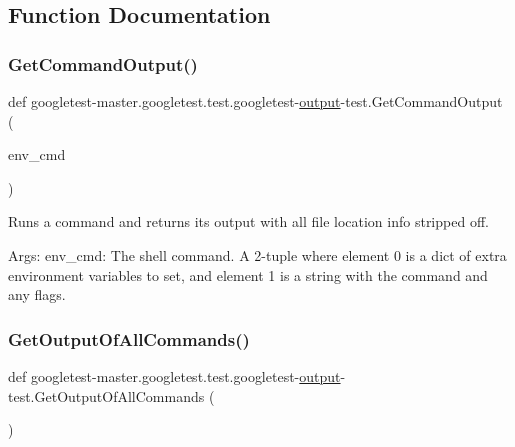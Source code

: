 \subsection{Function Documentation}
\mbox{\label{namespacegoogletest-master_1_1googletest_1_1test_1_1googletest-output-test_a36fa313f94b26c52704231f2a0d4e20a}} 
\subsubsection{\texorpdfstring{GetCommandOutput()}{GetCommandOutput()}}
{\footnotesize\ttfamily def googletest-\/master.\+googletest.\+test.\+googletest-\/\mbox{\hyperlink{namespacegoogletest-master_1_1googletest_1_1test_1_1googletest-output-test_a734f0a5bd94ba038f4350763c6977129}{output}}-\/test.\+Get\+Command\+Output (\begin{DoxyParamCaption}\item[{}]{env\+\_\+cmd }\end{DoxyParamCaption})}

\begin{DoxyVerb}Runs a command and returns its output with all file location
info stripped off.

Args:
  env_cmd:  The shell command. A 2-tuple where element 0 is a dict of extra
            environment variables to set, and element 1 is a string with
            the command and any flags.
\end{DoxyVerb}
 \mbox{\label{namespacegoogletest-master_1_1googletest_1_1test_1_1googletest-output-test_ae53cb6eb6487f7f2f8ed334f9afb0f4e}} 
\subsubsection{\texorpdfstring{GetOutputOfAllCommands()}{GetOutputOfAllCommands()}}
{\footnotesize\ttfamily def googletest-\/master.\+googletest.\+test.\+googletest-\/\mbox{\hyperlink{namespacegoogletest-master_1_1googletest_1_1test_1_1googletest-output-test_a734f0a5bd94ba038f4350763c6977129}{output}}-\/test.\+Get\+Output\+Of\+All\+Commands (\begin{DoxyParamCaption}{ }\end{DoxyParamCaption})}

